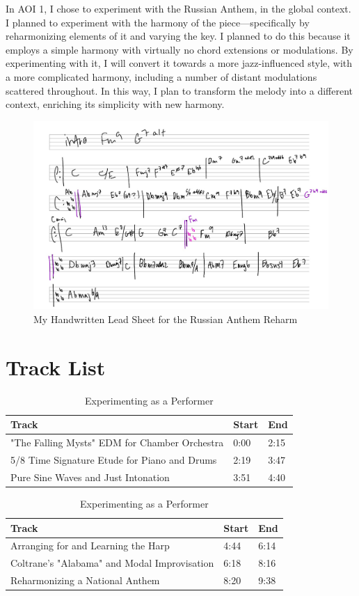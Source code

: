 \documentclass[12pt]{article}
\begin{document}
In AOI 1, I chose to experiment with the Russian Anthem, in the global context. I planned to experiment with the harmony of the piece—specifically by reharmonizing elements of it and varying the key. I planned to do this because it employs a simple harmony with virtually no chord extensions or modulations. By experimenting with it, I will convert it towards a more jazz-influenced style, with a more complicated harmony, including a number of distant modulations scattered throughout. In this way, I plan to transform the melody into a different context, enriching its simplicity with new harmony. 

\begin{figure}[H]
\centering
\includegraphics[width=0.85\linewidth]{anthem}
\caption{My Handwritten Lead Sheet for the Russian Anthem Reharm}
\label{fig:anthem}
\end{figure}


\section{Track List}

\begin{table}[H]
\centering
\begin{tabularx}{0.9\textwidth}{@{}lX@{}X@{}}
\toprule
\textbf{Track} & \textbf{Start} & \textbf{End} \\ \midrule
"The Falling Mysts" EDM for Chamber Orchestra & 0:00 & 2:15 \\
5/8 Time Signature Etude for Piano and Drums & 2:19 & 3:47 \\
Pure Sine Waves and Just Intonation & 3:51 & 4:40 \\ \bottomrule
\end{tabularx}
\caption{Experimenting as a Creator}
\vspace*{0.5cm}
\begin{tabularx}{0.9\textwidth}{@{}lX@{}X@{}}
\toprule
\textbf{Track} & \textbf{Start} & \textbf{End} \\ \midrule
Arranging for and Learning the Harp & 4:44 & 6:14 \\
Coltrane's "Alabama" and Modal Improvisation\hspace*{10pt} & 6:18 & 8:16 \\
Reharmonizing a National Anthem & 8:20 & 9:38 \\ \bottomrule
\end{tabularx}
\caption{Experimenting as a Performer}
\end{table}
\end{document}
